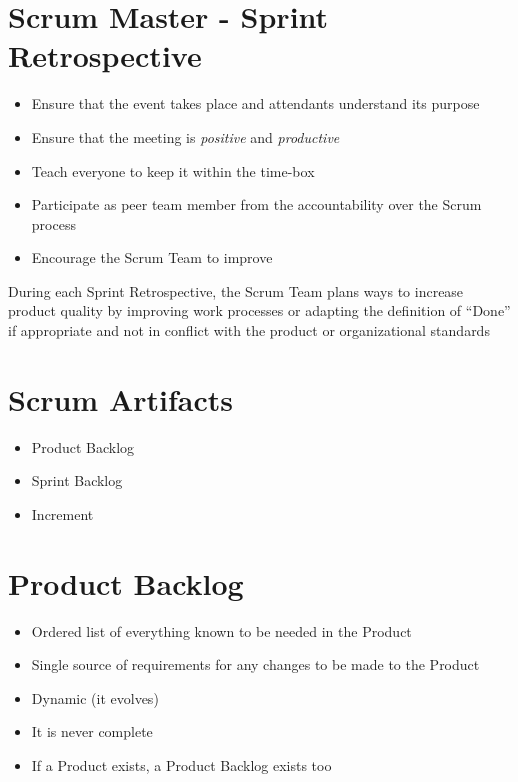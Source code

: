 \documentclass[a4paper,11pt,twocolumn]{article}
\begin{document}
\section*{Scrum Master - Sprint Retrospective}
\begin{itemize}
	\item Ensure that the event takes place and attendants understand its purpose
	\item Ensure that the meeting is \textit{positive} and \textit{productive}
	\item Teach everyone to keep it within the time-box
	\item Participate as peer team member from the accountability over the Scrum process
	\item Encourage the Scrum Team to improve
\end{itemize}

\begin{tcolorbox}[colback=black!8!white,colframe=gray!50!black,title=Note,sharp corners,fonttitle=\normalsize\bfseries,fontupper=\normalsize,left=0.7em,right=0.7em]
	During each Sprint Retrospective, the Scrum Team plans ways to increase product quality by improving work processes or adapting the definition of ``Done'' if appropriate and not in conflict with the product or organizational standards
\end{tcolorbox}

\section*{Scrum Artifacts}
\begin{itemize}
	\item Product Backlog
	\item Sprint Backlog
	\item Increment
\end{itemize}

\section*{Product Backlog}
\begin{itemize}
	\item Ordered list of everything known to be needed in the Product
	\item Single source of requirements for any changes to be made to the Product
	\item Dynamic (it evolves)
	\item It is never complete
	\item If a Product exists, a Product Backlog exists too
\end{itemize}
\end{document}
